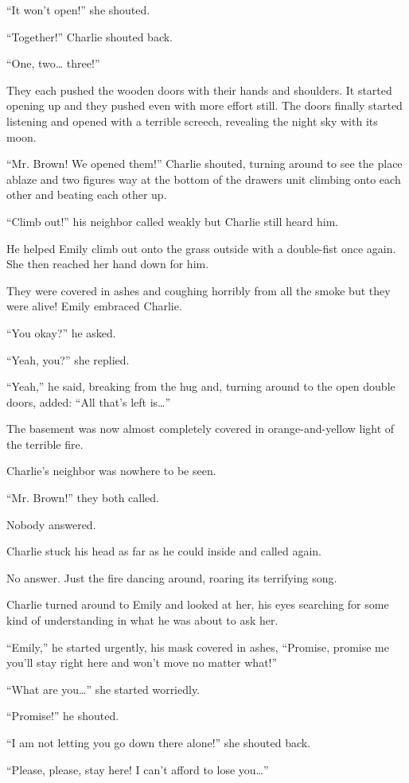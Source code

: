 “It won’t open!” she shouted.

“Together!” Charlie shouted back.

“One, two… three!”

They each pushed the wooden doors with their hands and shoulders. It started opening up and they pushed even with more effort still. The doors finally started listening and opened with a terrible screech, revealing the night sky with its moon.

“Mr. Brown! We opened them!” Charlie shouted, turning around to see the place ablaze and two figures way at the bottom of the drawers unit climbing onto each other and beating each other up.

“Climb out!” his neighbor called weakly but Charlie still heard him.

He helped Emily climb out onto the grass outside with a double-fist once again. She then reached her hand down for him.

They were covered in ashes and coughing horribly from all the smoke but they were alive! Emily embraced Charlie.

“You okay?” he asked.

“Yeah, you?” she replied.

“Yeah,” he said, breaking from the hug and, turning around to the open double doors, added: “All that’s left is…”

The basement was now almost completely covered in orange-and-yellow light of the terrible fire.

Charlie’s neighbor was nowhere to be seen.

“Mr. Brown!” they both called.

Nobody answered.

Charlie stuck his head as far as he could inside and called again.

No answer. Just the fire dancing around, roaring its terrifying song.

Charlie turned around to Emily and looked at her, his eyes searching for some kind of understanding in what he was about to ask her.

“Emily,” he started urgently, his mask covered in ashes, “Promise, promise me you’ll stay right here and won’t move no matter what!”

“What are you…” she started worriedly.

“Promise!” he shouted.

“I am not letting you go down there alone!” she shouted back.

“Please, please, stay here! I can’t afford to lose you…”


